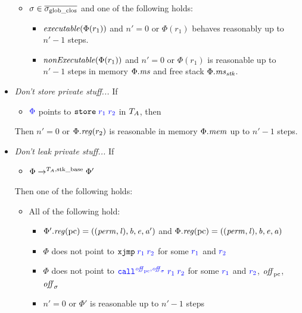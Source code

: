 \documentclass[a4paper]{article}
\begin{document}
\begin{definition}
\begin{itemize}
\begin{itemize}
    \item $\sigma \in \gsigcloss$ and one of the following holds:
      \begin{itemize}
      \item $\exec{\Phi(r_1)}$ and $n' = 0$ or $\Phi(r_1)$ behaves reasonably up to $n' - 1$ steps.
      \item $\nonExec{\Phi(r_1)}$ and $n' = 0$ or $\Phi(r_1)$ is reasonable up to $n' - 1$ steps in memory $\Phi.\ms$ and free stack $\Phi.\ms_\stk$.
      \end{itemize}
    \end{itemize}
  \item \emph{Don't store private stuff...} If
    \begin{itemize}
    \item $\src{\Phi}$ points to $\src{\tstore{r_1}{r_2}}$ in $\ta$, then
    \end{itemize}
    Then $n' = 0$ or $\Phi.\reg(r_2)$ is reasonable in memory $\Phi.\mem$ up to $n' -1$ steps.
  \item \emph{Don't leak private stuff...} If
    \begin{itemize}
    \item $\Phi \step[\ta,\stkb] \Phi'$
    \end{itemize}
    Then one of the following holds:
    \begin{itemize}
    \item All of the following hold:
      \begin{itemize}
      \item $\Phi'.\reg(\pcreg) =
        ((\perm,\lin),\baddr,\eaddr,\aaddr')$ and $\Phi.\reg(\pcreg) =
        ((\perm,\lin),\baddr,\eaddr,\aaddr)$
      \item $\Phi$ does not point to $\src{\txjmp{r_1}{r_2}}$ for some $\src{r_1}$ and $\src{r_2}$
      \item $\Phi$ does not point to $\src{\scall{\offpc,\offsigma}{r_1}{r_2}}$ for some $\src{r_1}$ and $\src{r_2}$, $\offpc$, $\offsigma$
      \item $n' = 0$ or $\Phi'$ is reasonable up to $n'-1$ steps
      \end{itemize}

\end{itemize}
\end{itemize}
\end{definition}
\end{document}
